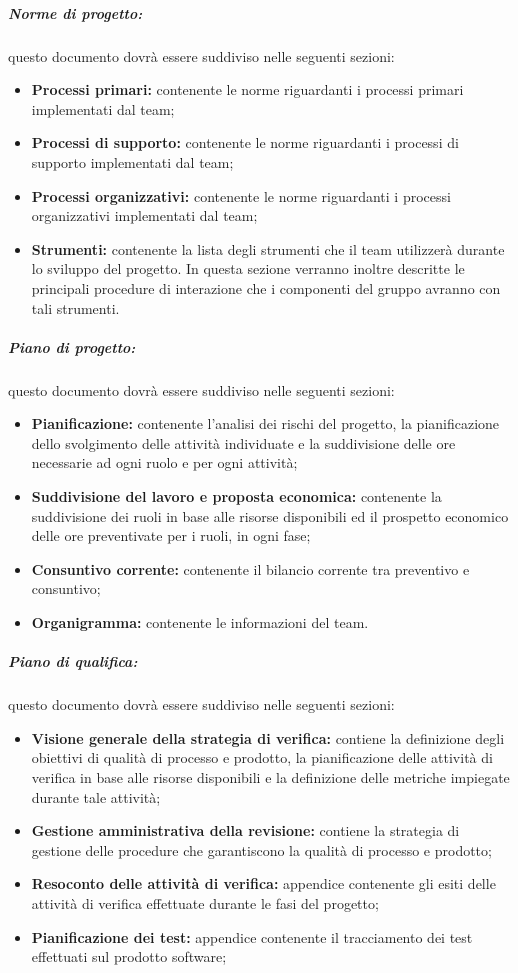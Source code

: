 \subparagraph{Norme di progetto:} questo documento dovrà essere suddiviso nelle seguenti sezioni:
\begin{itemize}
\item \textbf{Processi primari:} contenente le norme riguardanti i processi primari implementati dal team;
\item \textbf{Processi di supporto:} contenente le norme riguardanti i processi di supporto implementati dal team;
\item \textbf{Processi organizzativi:} contenente le norme riguardanti i processi organizzativi implementati dal team;
\item \textbf{Strumenti:} contenente la lista degli strumenti che il team utilizzerà durante lo sviluppo del progetto. In questa sezione verranno inoltre descritte le principali procedure di interazione che i componenti del gruppo avranno con tali strumenti.
\end{itemize}

\subparagraph{Piano di progetto:} questo documento dovrà essere suddiviso nelle seguenti sezioni:
\begin{itemize}
\item \textbf{Pianificazione:} contenente l'analisi dei rischi del progetto, la pianificazione dello svolgimento delle attività individuate e la suddivisione delle ore necessarie ad ogni ruolo e per ogni attività; 
\item \textbf{Suddivisione del lavoro e proposta economica:} contenente la suddivisione dei ruoli in base alle risorse disponibili ed il prospetto economico delle ore preventivate per i ruoli, in ogni fase;
\item \textbf{Consuntivo corrente:} contenente il bilancio corrente tra preventivo e consuntivo;
\item \textbf{Organigramma:} contenente le informazioni del team.
\end{itemize}

\subparagraph{Piano di qualifica:} questo documento dovrà essere suddiviso nelle seguenti sezioni:
\begin{itemize}
\item \textbf{Visione generale della strategia di verifica:} contiene la definizione degli obiettivi di qualità di processo e prodotto, la pianificazione delle attività di verifica in base alle risorse disponibili e la definizione delle metriche impiegate durante tale attività;
\item \textbf{Gestione amministrativa della revisione:} contiene la strategia di gestione delle procedure che garantiscono la qualità di processo e prodotto;
\item \textbf{Resoconto delle attività di verifica:} appendice contenente gli esiti delle attività di verifica effettuate durante le fasi del progetto;
\item \textbf{Pianificazione dei test:} appendice contenente il tracciamento dei test effettuati sul prodotto software;
\end{itemize}

